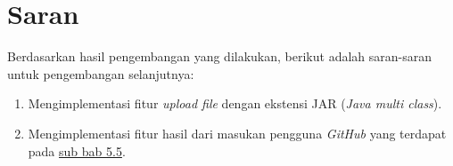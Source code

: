 \section{Saran}
Berdasarkan hasil pengembangan yang dilakukan, berikut adalah saran-saran untuk pengembangan selanjutnya:
\begin{enumerate}
	\item Mengimplementasi fitur \textit{upload file} dengan ekstensi JAR (\textit{Java multi class}).
	\item Mengimplementasi fitur hasil dari masukan pengguna \textit{GitHub} yang terdapat pada \hyperref[sec:masukangithub]{sub bab 5.5}.
\end{enumerate}